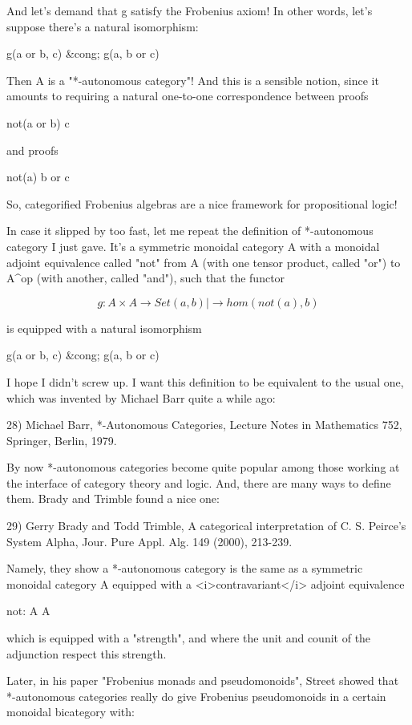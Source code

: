 And let's demand that g satisfy the Frobenius
axiom!  In other words, let's suppose there's a natural
isomorphism:

g(a or b, c) &cong; g(a, b or c)

Then A is a "*-autonomous category"!  And this is 
a sensible notion, since it amounts to requiring a natural
one-to-one correspondence between proofs

not(a or b) \to  c

and proofs

not(a) \to  b or c

So, categorified Frobenius algebras are a nice framework for
propositional logic!

In case it slipped by too fast, let me repeat the definition of
*-autonomous category I just gave.  It's a symmetric monoidal
category A with a monoidal adjoint
equivalence called "not" from A (with one tensor product,
called "or") to A^{op} (with another, called 
"and"), such that the functor 


$$

g: A \times  A  \to  Set
   (a,b) |\to  hom(not(a),b)
$$
    

is equipped with a natural isomorphism 

g(a or b, c) &cong; g(a, b or c)

I hope I didn't screw up.  I want this definition to
be equivalent to the usual one,
which was invented by Michael Barr quite a while ago:

28) Michael Barr, *-Autonomous Categories, Lecture Notes in 
Mathematics 752, Springer, Berlin, 1979.

By now *-autonomous categories become quite popular among those
working at the interface of category theory and logic.  And, there
are many ways to define them.  Brady and Trimble found a nice one:

29) Gerry Brady and Todd Trimble, A categorical interpretation 
of C. S. Peirce's System Alpha, Jour. Pure Appl. Alg. 149
(2000), 213-239.  

Namely, they show a *-autonomous category is the same as a symmetric
monoidal category A equipped with a <i>contravariant</i> 
adjoint equivalence

not: A \to  A 

which is equipped with a "strength", and where the unit and counit of 
the adjunction respect this strength.

Later, in his paper "Frobenius monads and pseudomonoids", Street 
showed that *-autonomous categories really do give Frobenius 
pseudomonoids in a certain monoidal bicategory with:


